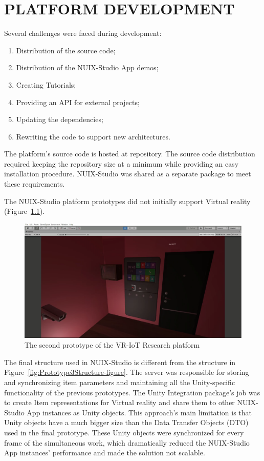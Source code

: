 
\chapter{PLATFORM DEVELOPMENT}

Several challenges were faced during development:
\begin{enumerate}
    \item Distribution of the source code;
    \item Distribution of the NUIX-Studio App demos;
    \item Creating Tutorials;
    \item Providing an API for external projects;
    \item Updating the dependencies;
    \item Rewriting the code to support new architectures.
\end{enumerate}

The platform's source code is hosted at \cite{NUIXStudio} repository. The source code distribution required keeping the repository size at a minimum while providing an easy installation procedure. NUIX-Studio was shared as a separate package to meet these requirements.

The NUIX-Studio platform prototypes did not initially support Virtual reality (Figure~\ref{fig:Prototype2-figure}).


\begin{figure}
  \centering
  \includegraphics[width=0.6\linewidth]{figures/Prototype2.png}
  \caption{The second prototype of the VR-IoT Research platform}
  \label{fig:Prototype2-figure}
\end{figure}

The final structure used in NUIX-Studio is different from the structure in Figure~\ref{fig:Prototype3Structure-figure}. The server was responsible for storing and synchronizing item parameters and maintaining all the Unity-specific functionality of the previous prototypes. The Unity Integration package's job was to create Item representations for Virtual reality and share them to other NUIX-Studio App instances as Unity objects. This approach's main limitation is that Unity objects have a much bigger size than the Data Transfer Objects (DTO) used in the final prototype. These Unity objects were synchronized for every frame of the simultaneous work, which dramatically reduced the NUIX-Studio App instances' performance and made the solution not scalable.


